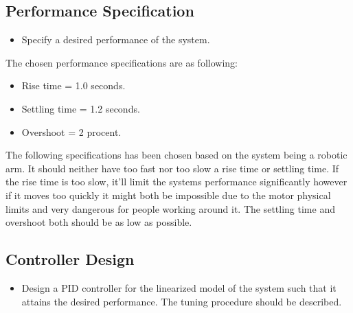 \documentclass[12pt]{article}
\begin{document}
\subsection*{Performance Specification}

\begin{itemize}
  \item Specify a desired performance of the system.
\end{itemize}
The chosen performance specifications are as following:
\begin{itemize}
  \item Rise time = 1.0 seconds.
  \item Settling time = 1.2 seconds.
  \item Overshoot = 2 procent.
\end{itemize}
 The following specifications has been chosen based on the system being a robotic arm. It should neither have too fast nor too slow a rise time or settling time. If the rise time is too slow, it'll limit the systems performance significantly however if it moves too quickly it might both be impossible due to the motor physical limits and very dangerous for people working around it. The settling time and overshoot both should be as low as possible.
\subsection*{Controller Design}
\begin{itemize}
  \item Design a PID controller for the linearized model of the system such that it attains the desired performance. The tuning procedure should be described.
\end{itemize}
\end{document}
